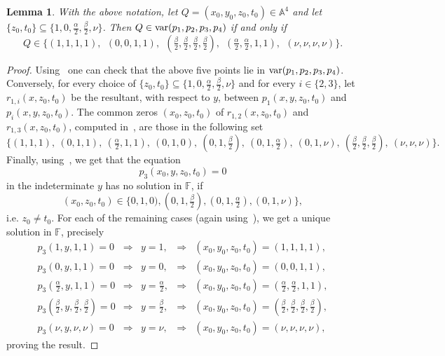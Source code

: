 \documentclass[a4paper]{amsart}
\newtheorem{lemma}{Lemma}[section]
\newcommand{\Var}{{\rm var}}
\newcommand{\F}{{\mathbb F}}
\newcommand{\al}{\alpha}
\newcommand{\bt}{\beta}
\begin{document}
\begin{lemma}\label{solgen}
With the above notation,  let $Q=(x_0, y_0, z_0, t_0)\in \mathbb A^4$ and let 
$\{z_0, t_0\}\subseteq  \{ 1, 0, \tfrac{\al}{2}, \tfrac{\bt}{2}, \nu \}$. Then $Q\in {\Var}(p_1, p_2, p_3, p_4)$  if and only if 
$$
Q\in \{(1,1,1,1),\:\: (0,0,1,1), \:\: (\tfrac{\bt}{2}, \tfrac{\bt}{2}, \tfrac{\bt}{2}, \tfrac{\bt}{2}),\:\: ( \tfrac{\al}{2}, \tfrac{\al}{2}, 1,1 ), \:\: (\nu, \nu, \nu, \nu)\}.
$$
\end{lemma}
\begin{proof}
Using~\cite[genericsakuma.s]{code} one can check that the above five points lie in ${\Var}(p_1, p_2, p_3, p_4)$. Conversely, 
for every choice of $\{z_0, t_0\}\subseteq  \{ 1, 0, \tfrac{\al}{2}, \tfrac{\bt}{2}, \nu \}$ and for every $i\in \{2,3\}$, let  
 $r_{1,i}(x, z_0, t_0)$ be the resultant, with respect to $y$, between $p_1(x,y, z_0, t_0)$ and $p_i(x,y, z_0, t_0)$.
The common zeros  $(x_0, z_0, t_0)$ of $r_{1,2}(x, z_0, t_0)$ and $r_{1,3}(x, z_0, t_0)$, computed in~\cite[genericsakuma.s]{code},  are  those in the following set
$$
\{(1, 1, 1), \:(0, 1, 1), \:(\tfrac{\al}{2}, 1, 1), \:(0, 1, 0), \:(0, 1, \tfrac{\bt}{2}),
\:(0, 1, \tfrac{\al}{2}), \:(0, 1, \nu), \: (\tfrac{\bt}{2}, \tfrac{\bt}{2}, \tfrac{\bt}{2}), \:(\nu, \nu, \nu)\}.
$$
Finally, using~\cite[genericsakuma.s]{code}, we get that   the equation 
$$
p_3(x_0,y, z_0, t_0)=0
$$ 
in the indeterminate $y$ has no solution in $\F$, if 
$$
(x_0, z_0, t_0)\in \{0,1,0), (0, 1, \tfrac{\bt}{2}), (0, 1, \tfrac{\al}{2}), (0, 1, \nu)\},
$$ 
i.e. $z_0\neq t_0$. For each of the  remaining cases (again using~\cite[genericsakuma.s]{code}), we get a unique solution in $\F$, precisely
$$
\begin{array}{llllll}
p_3(1,y,1,1)=0&  \Longrightarrow  &y=1,& \Longrightarrow  &(x_0, y_0, z_0, t_0)=(1,1,1,1), \\
p_3(0,y,1,1)=0& \Longrightarrow  &y=0,& \Longrightarrow  &(x_0, y_0, z_0, t_0)=(0,0,1,1),\\
p_3(\tfrac{\al}{2},y,1,1)=0& \Longrightarrow  &y=\tfrac{\al}{2},& \Longrightarrow  &(x_0, y_0, z_0, t_0)=( \tfrac{\al}{2}, \tfrac{\al}{2}, 1,1 ),\\
p_3(\tfrac{\bt}{2},y,\tfrac{\bt}{2},\tfrac{\bt}{2})=0& \Longrightarrow  &y=\tfrac{\bt}{2},& \Longrightarrow &(x_0, y_0, z_0, t_0)=(\tfrac{\bt}{2}, \tfrac{\bt}{2}, \tfrac{\bt}{2}, \tfrac{\bt}{2}),\\
p_3(\nu, y, \nu, \nu)=0 &\Longrightarrow &y= \nu,& \Longrightarrow  &(x_0, y_0, z_0, t_0)=(\nu, \nu, \nu, \nu),
\end{array}
$$
proving the result.
\end{proof}
\end{document}
